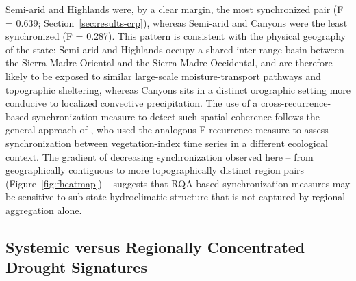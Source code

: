 \documentclass[climate,article,submit,moreauthors]{Definitions/mdpi}
\begin{document}
Semi-arid and Highlands were, by a clear margin, the most synchronized pair
(F = 0.639; Section~\ref{sec:results-crp}), whereas Semi-arid and Canyons
were the least synchronized (F = 0.287). This pattern is consistent with the
physical geography of the state: Semi-arid and Highlands occupy a shared
inter-range basin between the Sierra Madre Oriental and the Sierra Madre
Occidental, and are therefore likely to be exposed to similar large-scale
moisture-transport pathways and topographic sheltering, whereas Canyons sits
in a distinct orographic setting more conducive to localized convective
precipitation. The use of a cross-recurrence-based synchronization measure to
detect such spatial coherence follows the general approach of
\cite{Semeraro2020}, who used the analogous F-recurrence measure to assess
synchronization between vegetation-index time series in a different
ecological context. The gradient of decreasing synchronization observed here
-- from geographically contiguous to more topographically distinct region
pairs (Figure~\ref{fig:fheatmap}) -- suggests that RQA-based synchronization
measures may be sensitive to sub-state hydroclimatic structure that is not
captured by regional aggregation alone.

\subsection{Systemic versus Regionally Concentrated Drought Signatures}
\label{sec:disc-events}
\end{document}
